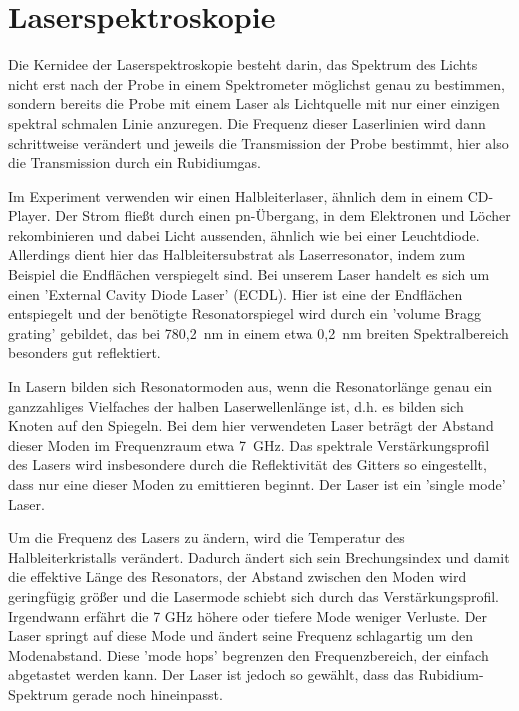 \section{Laserspektroskopie}

Die Kernidee der Laserspektroskopie besteht darin, das Spektrum des Lichts nicht erst nach der Probe in einem Spektrometer möglichst genau zu bestimmen, sondern bereits die Probe mit einem Laser als Lichtquelle mit nur einer einzigen spektral schmalen Linie anzuregen. Die Frequenz dieser Laserlinien wird dann schrittweise verändert und jeweils die Transmission der Probe bestimmt, hier also die Transmission durch ein Rubidiumgas.

Im Experiment verwenden wir einen Halbleiterlaser, ähnlich dem in einem CD-Player. Der Strom fließt durch einen pn-Übergang, in dem Elektronen und Löcher rekombinieren und dabei Licht aussenden, ähnlich wie bei einer Leuchtdiode. Allerdings dient hier das Halbleitersubstrat als Laserresonator, indem zum Beispiel die Endflächen verspiegelt sind. Bei unserem Laser handelt es sich um einen 'External Cavity Diode Laser' (ECDL). Hier ist eine der Endflächen entspiegelt und der benötigte Resonatorspiegel wird durch ein 'volume Bragg grating' gebildet, das bei 780,2~nm in einem etwa 0,2~nm breiten Spektralbereich besonders gut reflektiert.

In Lasern bilden sich Resonatormoden aus, wenn die Resonatorlänge genau ein ganzzahliges Vielfaches der halben Laserwellenlänge ist, d.h. es bilden sich Knoten auf den Spiegeln. Bei dem hier verwendeten Laser beträgt der Abstand dieser Moden im Frequenzraum etwa 7~GHz. Das spektrale Verstärkungsprofil des Lasers wird insbesondere durch die Reflektivität des Gitters so eingestellt, dass nur eine dieser Moden zu emittieren beginnt. Der Laser ist ein 'single mode' Laser.

Um die Frequenz des Lasers zu ändern, wird die Temperatur des Halbleiterkristalls verändert. Dadurch ändert sich sein Brechungsindex und damit die effektive Länge des Resonators, der Abstand zwischen den Moden wird geringfügig größer und die Lasermode schiebt sich durch das Verstärkungsprofil. Irgendwann erfährt die 7 GHz höhere oder tiefere Mode weniger Verluste. Der Laser springt auf diese Mode und ändert seine Frequenz schlagartig um den Modenabstand. Diese 'mode hops' begrenzen den Frequenzbereich, der einfach abgetastet werden kann.  Der Laser ist jedoch so gewählt, dass das Rubidium-Spektrum gerade noch hineinpasst.


